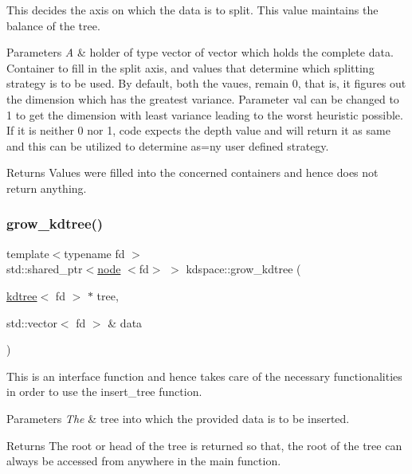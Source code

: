 This decides the axis on which the data is to split. This value maintains the balance of the tree. 


\begin{DoxyParams}{Parameters}
{\em A} & holder of type vector of vector which holds the complete data. Container to fill in the split axis, and values that determine which splitting strategy is to be used. By default, both the vaues, remain 0, that is, it figures out the dimension which has the greatest variance. Parameter \textquotesingle{}val\textquotesingle{} can be changed to 1 to get the dimension with least variance leading to the worst heuristic possible. If it is neither 0 nor 1, code expects the depth value and will return it as same and this can be utilized to determine as=ny user defined strategy. \\
\hline
\end{DoxyParams}
\begin{DoxyReturn}{Returns}
Values were filled into the concerned containers and hence does not return anything. 
\end{DoxyReturn}
\mbox{\label{namespacekdspace_a0c2e28665e0ac98030cc9b0d8e017435}} 
\subsubsection{\texorpdfstring{grow\+\_\+kdtree()}{grow\_kdtree()}}
{\footnotesize\ttfamily template$<$typename fd $>$ \\
std\+::shared\+\_\+ptr$<$\hyperlink{classnode}{node} $<$fd$>$ $>$ kdspace\+::grow\+\_\+kdtree (\begin{DoxyParamCaption}\item[{\hyperlink{classkdtree}{kdtree}$<$ fd $>$ $\ast$}]{tree,  }\item[{std\+::vector$<$ fd $>$ \&}]{data }\end{DoxyParamCaption})}



This is an interface function and hence takes care of the necessary functionalities in order to use the \textquotesingle{}insert\+\_\+tree\textquotesingle{} function. 


\begin{DoxyParams}{Parameters}
{\em The} & tree into which the provided data is to be inserted. \\
\hline
\end{DoxyParams}
\begin{DoxyReturn}{Returns}
The root or head of the tree is returned so that, the root of the tree can always be accessed from anywhere in the main function. 
\end{DoxyReturn}
\mbox{\label{namespacekdspace_ae38cb61fa0fc73b8cced4a1bc0fb1d58}} 
